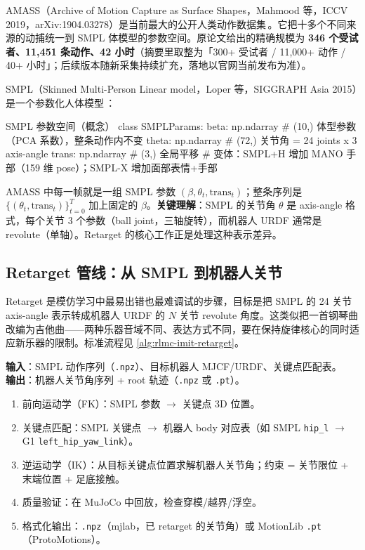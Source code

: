 AMASS（Archive of Motion Capture as Surface Shapes，Mahmood 等，ICCV 2019，arXiv:1904.03278）是当前最大的公开人类动作数据集\,\cite{mahmood2019amass}。它把十多个不同来源的动捕统一到 SMPL 体模型的参数空间。原论文给出的精确规模为 \textbf{346 个受试者、11{,}451 条动作、42 小时}（摘要里取整为「300+ 受试者 / 11{,}000+ 动作 / 40+ 小时」；后续版本随新采集持续扩充，落地以官网当前发布为准）。

SMPL（Skinned Multi-Person Linear model，Loper 等，SIGGRAPH Asia 2015）是一个参数化人体模型\,\cite{loper2015smpl}：

\begin{codebox}[Python]{SMPL 参数空间（概念）}
class SMPLParams:
    beta:  np.ndarray  # (10,)  体型参数（PCA 系数），整条动作内不变
    theta: np.ndarray  # (72,)  关节角 = 24 joints x 3 axis-angle
    trans: np.ndarray  # (3,)   全局平移
# 变体：SMPL+H 增加 MANO 手部（159 维 pose）；SMPL-X 增加面部表情+手部
\end{codebox}

AMASS 中每一帧就是一组 SMPL 参数 $(\beta,\theta_t,\text{trans}_t)$；整条序列是 $\{(\theta_t,\text{trans}_t)\}_{t=0}^{T}$ 加上固定的 $\beta$。\textbf{关键理解}：SMPL 的关节角 $\theta$ 是 axis-angle 格式，每个关节 3 个参数（ball joint，三轴旋转），而机器人 URDF 通常是 revolute（单轴）。Retarget 的核心工作正是处理这种表示差异。

\subsection{Retarget 管线：从 SMPL 到机器人关节}
\label{sec:rlmc-imit-data-retarget}

Retarget 是模仿学习中最易出错也最难调试的步骤，目标是把 SMPL 的 24 关节 axis-angle 表示转成机器人 URDF 的 $N$ 关节 revolute 角度。这类似把一首钢琴曲改编为吉他曲——两种乐器音域不同、表达方式不同，要在保持旋律核心的同时适应新乐器的限制。标准流程见 \cref{alg:rlmc-imit-retarget}。

\begin{algo}\label{alg:rlmc-imit-retarget}
\textbf{输入}：SMPL 动作序列（\texttt{.npz}）、目标机器人 MJCF/URDF、关键点匹配表。\\
\textbf{输出}：机器人关节角序列 + root 轨迹（\texttt{.npz} 或 \texttt{.pt}）。
\begin{enumerate}
  \item 前向运动学（FK）：SMPL 参数 $\to$ 关键点 3D 位置。
  \item 关键点匹配：SMPL 关键点 $\to$ 机器人 body 对应表（如 SMPL \texttt{hip\_l} $\to$ G1 \texttt{left\_hip\_yaw\_link}）。
  \item 逆运动学（IK）：从目标关键点位置求解机器人关节角；约束 = 关节限位 + 末端位置 + 足底接触。
  \item 质量验证：在 MuJoCo 中回放，检查穿模/越界/浮空。
  \item 格式化输出：\texttt{.npz}（mjlab，已 retarget 的关节角）或 MotionLib \texttt{.pt}（ProtoMotions）。
\end{enumerate}
\end{algo}

